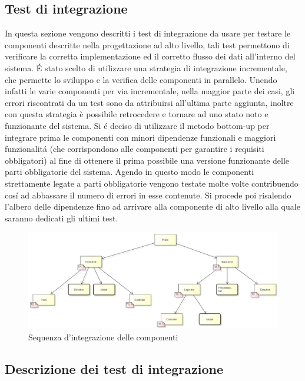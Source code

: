 \newpage

\subsection{Test di integrazione}
In questa sezione vengono descritti i test di integrazione da usare per testare le componenti descritte nella progettazione ad alto livello, tali test permettono di verificare la corretta implementazione ed il corretto flusso dei dati all'interno del sistema. \'E stato scelto di utilizzare una strategia di integrazione incrementale, che permette lo sviluppo e la verifica delle componenti in parallelo. Unendo infatti le varie componenti per via incrementale, nella maggior parte dei casi, gli errori riscontrati da un test sono da attribuirsi all'ultima parte aggiunta, inoltre con questa strategia è possibile retrocedere e tornare ad uno stato noto e funzionante del sistema. Si \'e deciso di utilizzare il metodo \gls{bottom-up} per integrare prima le componenti con minori dipendenze funzionali e maggiori funzionalit\'a (che corrispondono alle componenti per garantire i requisiti obbligatori) al fine di ottenere il prima possibile una versione funzionante delle parti obbligatorie del sistema. Agendo in questo modo le componenti strettamente legate a parti obbligatorie vengono testate molte volte contribuendo cos\'i ad abbassare il numero di errori in esse contenute. Si procede poi risalendo l'albero delle dipendenze fino ad arrivare alla componente di alto livello alla quale saranno dedicati gli ultimi test.

\begin{figure}[h]
\centering
\includegraphics[width=1\linewidth]{img/Integrazione_componenti.png}
\caption[Sequenza d'integrazione delle componenti]{Sequenza d'integrazione delle componenti}
\label{fig:Integrazione_componenti}
\end{figure}

\subsection{Descrizione dei test di integrazione}



